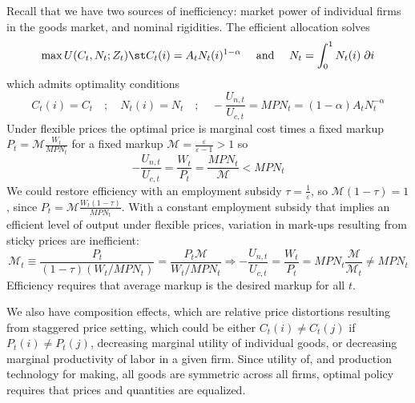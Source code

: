 \documentclass[10pt]{article}
\begin{document}
Recall that we have two sources of inefficiency: market power of individual firms in the goods market, and nominal rigidities. The efficient allocation solves
\[\max U(C_t,N_t;Z_t) \st C_t(i) = A_tN_t(i)^{1-\alpha} \quad \text{ and } \quad N_t = \int_0^1 N_t(i)\;\partial i\]which admits optimality conditions \[C_t(i) = C_t \quad ; \quad N_t(i)=N_t \quad ; \quad -\frac{U_{n,t}}{U_{c,t}} = MPN_t = (1-\alpha)A_t N_t^{-\alpha}\]Under flexible prices the optimal price is marginal cost times a fixed markup $P_t = \mathcal{M} \frac{W_t}{MPN_t}$ for a fixed markup $\mathcal{M} = \frac{\varepsilon}{\varepsilon-1}> 1$ so\[-\frac{U_{n,t}}{U_{c,t}} = \frac{W_t}{P_t} = \frac{MPN_t}{\mathcal{M}} < MPN_t\]We could restore efficiency with an employment subsidy $\tau = \frac{1}{\varepsilon}$, so $\mathcal{M} (1-\tau) = 1$, since $P_t = \mathcal{M}\frac{W_t (1-\tau)}{MPN_t}$. With a constant employment subsidy that implies an efficient level of output under flexible prices, variation in mark-ups resulting from sticky prices are inefficient:\[\mathcal{M}_t \equiv \frac{P_t}{(1-\tau)(W_t/MPN_t)} = \frac{P_t \mathcal{M}}{W_t/MPN_t} \Longrightarrow - \frac{U_{n,t}}{U_{c,t}} = \frac{W_t}{P_t} = MPN_t \frac{\mathcal{M}}{\mathcal{M}_t} \ne MPN_t\]Efficiency requires that average markup is the desired markup for all $t$.

We also have composition effects, which are relative price distortions resulting from staggered price setting, which could be either $C_t(i) \ne C_t(j)$ if $P_t(i) \ne P_t(j)$, decreasing marginal utility of individual goods, or decreasing marginal productivity of labor in a given firm. Since utility of, and production technology for making, all goods are symmetric across all firms, optimal policy requires that prices and quantities are equalized.
\end{document}
